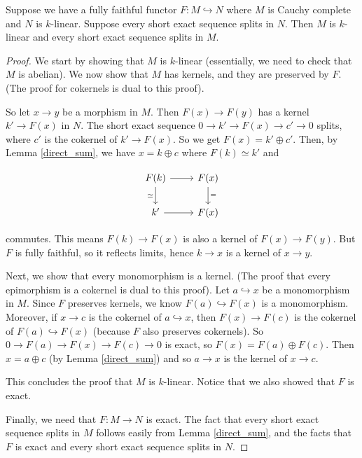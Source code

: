 \begin{lemma}\label{abelian}

  \noindent Suppose we have a fully faithful functor $F:M\hookrightarrow N$
  where $M$ is Cauchy complete and $N$ is $k$-linear. Suppose every short
  exact sequence splits in $N$. Then $M$ is $k$-linear and every short exact
  sequence splits in $M$.
\end{lemma}

\begin{proof}
  We start by showing that $M$ is $k$-linear (essentially, we need to check
  that $M$ is abelian). We now show that $M$ has kernels, and they are
  preserved by $F$. (The proof for cokernels is dual to this proof).

  So let $x\to y$ be a morphism in $M$. Then $F(x)\to F(y)$ has a kernel
  $k'\to F(x)$ in $N$. The short exact sequence $0\to k'\to F(x)\to c'\to 0$
  splits, where $c'$ is the cokernel of $k'\to F(x)$. So we get $F(x)=k'\oplus
  c'$. Then, by Lemma \ref{direct_sum}, we have $x=k\oplus c$ where
  $F(k)\simeq k'$ and

  \[
    \begin{tikzcd}
      {F(k)} & {F(x)} \\
      {k'} & {F(x)} \arrow[from=1-1, to=1-2]
      \arrow["\simeq"', from=1-1, to=2-1]
      \arrow["{=}", from=1-2, to=2-2]
      \arrow[from=2-1, to=2-2]
    \end{tikzcd}
  \]

  commutes. This means $F(k)\to F(x)$ is also a kernel of $F(x)\to F(y)$. But
  $F$ is fully faithful, so it reflects limits, hence $k\to x$ is a kernel of
  $x\to y$.

  Next, we show that every monomorphism is a kernel. (The proof that every
  epimorphism is a cokernel is dual to this proof). Let $a\hookrightarrow x$
  be a monomorphism in $M$. Since $F$ preserves kernels, we know
  $F(a)\hookrightarrow F(x)$ is a monomorphism. Moreover, if $x\to c$ is the
  cokernel of $a\hookrightarrow x$, then $F(x)\to F(c)$ is the cokernel of
  $F(a)\hookrightarrow F(x)$ (because $F$ also preserves cokernels). So $0\to
  F(a)\to F(x)\to F(c)\to 0$ is exact, so $F(x)=F(a)\oplus F(c)$. Then
  $x=a\oplus c$ (by Lemma \ref{direct_sum}) and so $a\to x$ is the kernel of
  $x\to c$.

  This concludes the proof that $M$ is $k$-linear. Notice that we also showed that $F$ is exact.

  Finally, we need that $F:M \to N$ is exact. The fact that every short exact
  sequence splits in $M$ follows easily from Lemma \ref{direct_sum}, and the
  facts that $F$ is exact and every short exact sequence splits in $N$.
\end{proof}

